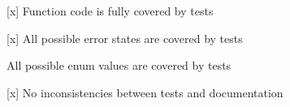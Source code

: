 {\ttfamily }

{\ttfamily 
\begin{DoxyItemize}
\item \mbox{[}x\mbox{]} Function code is fully covered by tests
\item \mbox{[}x\mbox{]} All possible error states are covered by tests
\item All possible enum values are covered by tests
\item \mbox{[}x\mbox{]} No inconsistencies between tests and documentation
\end{DoxyItemize}}

{\ttfamily }

{\ttfamily  }

{\ttfamily }